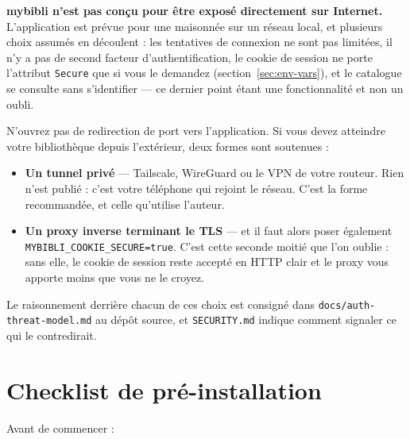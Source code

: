 \begin{warning}
\textbf{mybibli n'est pas conçu pour être exposé directement sur
Internet.} L'application est prévue
pour une maisonnée sur un réseau local, et plusieurs choix assumés en
découlent : les tentatives de connexion ne sont pas limitées, il n'y a
pas de second facteur d'authentification, le cookie de session ne porte
l'attribut \texttt{Secure} que si vous le demandez
(section~\ref{sec:env-vars}), et le catalogue se consulte sans
s'identifier --- ce dernier point étant une fonctionnalité et non un
oubli.

N'ouvrez pas de redirection de port vers l'application. Si vous devez
atteindre votre bibliothèque depuis l'extérieur, deux formes sont
soutenues :

\begin{itemize}
  \item \textbf{Un tunnel privé} --- Tailscale, WireGuard ou le VPN
        de votre routeur. Rien n'est publié : c'est votre téléphone qui
        rejoint le réseau. C'est la forme recommandée, et celle
        qu'utilise l'auteur.
  \item \textbf{Un proxy inverse terminant le TLS} --- et il faut
        alors poser également \texttt{MYBIBLI\_COOKIE\_SECURE=true}.
        C'est cette seconde moitié que l'on oublie : sans elle, le
        cookie de session reste accepté en HTTP clair et le proxy vous
        apporte moins que vous ne le croyez.
\end{itemize}

Le raisonnement derrière chacun de ces choix est consigné dans
\texttt{docs/auth-threat-model.md} au dépôt source, et
\texttt{SECURITY.md} indique comment signaler ce qui le contredirait.
\end{warning}

\section{Checklist de pré-installation}

Avant de commencer :

